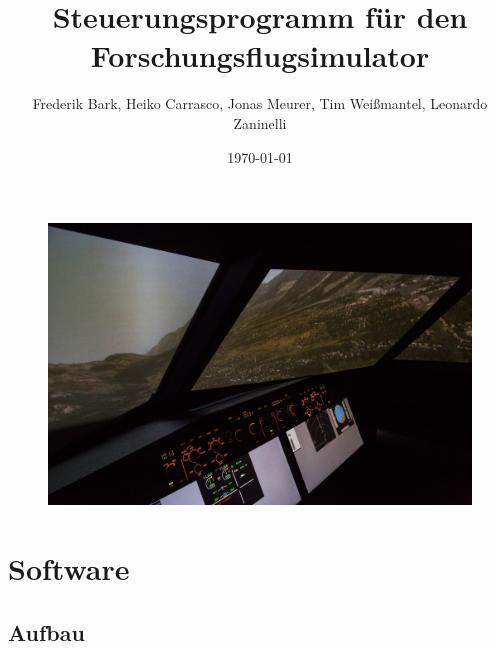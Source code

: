\documentclass[accentcolor=tud1b,colorbacktitle,landscape,german,presentation]{tudbeamer}
\title[]{Steuerungsprogramm für den \\Forschungsflugsimulator}
\subtitle{{\scriptsize Frederik Bark, Heiko Carrasco, Jonas Meurer, Tim Weißmantel, Leonardo Zaninelli}}
\institute{BP WS 2017/18 | Institut für Flugsysteme und Regelungstechnik}
\date{\today}
\begin{document}
\begin{titleframe}
	\vspace{-2.4mm}
	\begin{figure}
		\centering
		\includegraphics[scale=0.36]{simulator}
	\end{figure}
\end{titleframe}

\section{Software}
\subsection{Aufbau}
\end{document}
